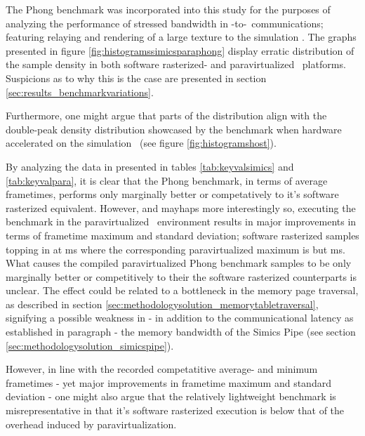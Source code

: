 \noindent
The Phong benchmark was incorporated into this study for the purposes of analyzing the performance of stressed bandwidth in \dvttermtarget -to-\dvttermhost\ communications; featuring relaying and rendering of a large texture to the simulation \dvttermhost .
The graphs presented in figure \ref{fig:histogramssimicsparaphong} display erratic distribution of the sample density in both software rasterized- and paravirtualized \dvttermsimics\ platforms.
Suspicions as to why this is the case are presented in section \ref{sec:results_benchmarkvariations}.

Furthermore, one might argue that parts of the distribution align with the double-peak density distribution showcased by the benchmark when hardware accelerated on the simulation \dvttermhost\ (see figure \ref{fig:histogramshost}).


By analyzing the data in presented in tables \ref{tab:keyvalsimics} and \ref{tab:keyvalpara}, it is clear that the Phong benchmark, in terms of average frametimes, performs only marginally better or competatively to it's software rasterized equivalent.
However, and mayhaps more interestingly so, executing the benchmark in the paravirtualized \dvttermsimics\ environment results in major improvements in terms of frametime maximum and standard deviation; software rasterized samples topping in at  ms where the corresponding paravirtualized maximum is but  ms.\\

\noindent
What causes the compiled paravirtualized Phong benchmark samples to be only marginally better or competitively to their the software rasterized counterparts is unclear.
The effect could be related to a bottleneck in the memory page traversal, as described in section \ref{sec:methodologysolution_memorytabletraversal}, signifying a possible weakness in - in addition to the communicational latency as established in paragraph  - the memory bandwidth of the Simics Pipe (see section \ref{sec:methodologysolution_simicspipe}).

However, in line with the recorded competatitive average- and minimum frametimes - yet major improvements in frametime maximum and standard deviation - one might also argue that the relatively lightweight benchmark is misrepresentative in that it's software rasterized execution is below that of the overhead induced by paravirtualization.

